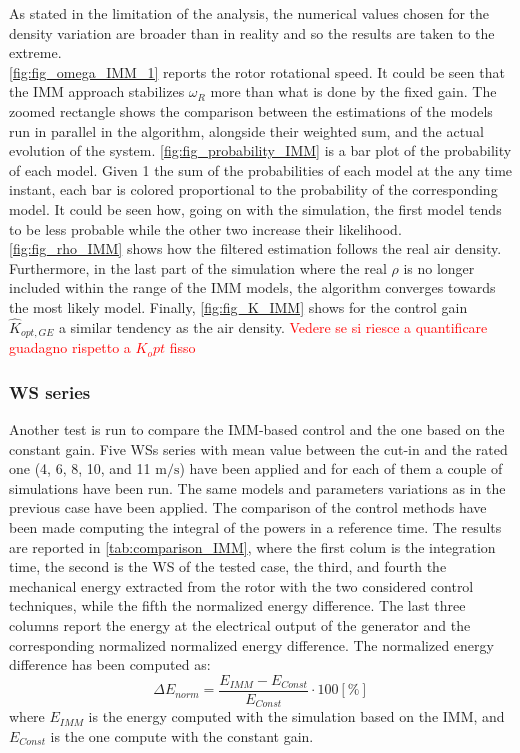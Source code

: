 As stated in the limitation of the analysis, the numerical values chosen for the density variation are broader than in reality and so the results are taken to the extreme. \\
\autoref{fig:fig_omega_IMM_1} reports the rotor rotational speed. It could be seen that the IMM approach stabilizes $\omega_R$ more than what is done by the fixed gain. The zoomed rectangle shows the comparison between the estimations of the models run in parallel in the algorithm, alongside their weighted sum, and the actual evolution of the system. \autoref{fig:fig_probability_IMM} is a bar plot of the probability of each model. Given 1 the sum of the probabilities of each model at the any time instant, each bar is colored proportional to the probability of the corresponding model. It could be seen how, going on with the simulation, the first model tends to be less probable while the other two increase their likelihood. \autoref{fig:fig_rho_IMM} shows how the filtered estimation follows the real air density. Furthermore, in the last part of the simulation where the real $\rho$ is no longer included within the range of the IMM models, the algorithm converges towards the most likely model. Finally, \autoref{fig:fig_K_IMM} shows for the control gain $\hat{K}_{opt,GE}$ a similar tendency as the air density. \textcolor{red}{Vedere se si riesce a quantificare guadagno rispetto a $K_opt$ fisso}

\subsubsection{WS series}
Another test is run to compare the IMM-based control and the one based on the constant gain. Five WSs series with mean value between the cut-in and the rated one (4, 6, 8, 10, and 11 $\si{\meter\per\second}$) have been applied and for each of them a couple of simulations have been run. The same models and parameters variations as in the previous case have been applied. The comparison of the control methods have been made computing the integral of the powers in a reference time. The results are reported in \autoref{tab:comparison_IMM}, where the first colum is the integration time, the second is the WS of the tested case, the third, and fourth the mechanical energy extracted from the rotor with the two considered control techniques, while the fifth the normalized energy difference. The last three columns report the energy at the electrical output of the generator and the corresponding normalized normalized energy difference. The normalized energy difference has been computed as:
\begin{equation}
  \Delta E_{norm} = \frac{E_{IMM}-E_{Const}}{E_{Const}}\cdot 100 \left[\%\right]
  \label{eq:energy_error}
\end{equation}
where $E_{IMM}$ is the energy computed with the simulation based on the IMM, and $E_{Const}$ is the one compute with the constant gain.

